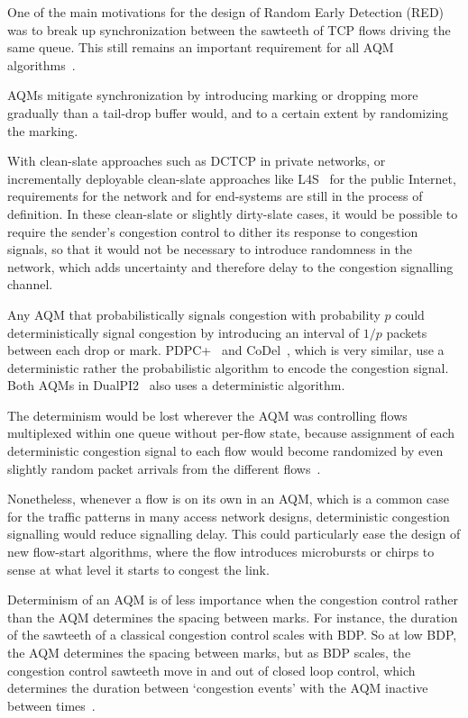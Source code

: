 One of the main motivations for the design of Random Early Detection (RED)~\cite{Floyd93:RED} was to break up synchronization between the sawteeth of TCP flows driving the same queue. This still remains an important requirement for all AQM algorithms~\cite{Baker15:AQM_Recommendations}.

AQMs mitigate synchronization by introducing marking or dropping more gradually than a tail-drop buffer would, and to a certain extent by randomizing the marking. 

With clean-slate approaches such as DCTCP in private networks, or incrementally deployable clean-slate approaches like L4S~\cite{Briscoe16a:l4s-arch_ID} for the public Internet, requirements for the network and for end-systems are still in the process of definition. In these clean-slate or slightly dirty-slate cases, it would be possible to require the sender's congestion control to dither its response to congestion signals, so that it would not be necessary to introduce randomness in the network, which adds uncertainty and therefore delay to the congestion signalling channel. 

Any AQM that probabilistically signals congestion with probability \(p\) could deterministically signal congestion by introducing an interval of \(1/p\) packets between each drop or mark. PDPC+~\cite{Sagfors03:PDPC_vary} and CoDel~\cite{Nichols12:CoDel}, which is very similar, use a deterministic rather the probabilistic algorithm to encode the congestion signal. Both AQMs in DualPI2~\cite[Appx.\ A]{Briscoe15e:DualQ-Coupled-AQM_ID} also uses a deterministic algorithm.

The determinism would be lost wherever the AQM was controlling flows multiplexed within one queue without per-flow state, because assignment of each deterministic congestion signal to each flow would become randomized by even slightly random packet arrivals from the different flows~\cite{Briscoe15d:PIE_rvw}.

Nonetheless, whenever a flow is on its own in an AQM, which is a common case for the traffic patterns in many access network designs,  deterministic congestion signalling would reduce signalling delay. This could particularly ease the design of new flow-start algorithms, where the flow introduces microbursts or chirps to sense at what level it starts to congest the link.

Determinism of an AQM is of less importance when the congestion control rather than the AQM determines the spacing between marks. For instance, the duration of the sawteeth of a classical congestion control scales with BDP. So at low BDP, the AQM determines the spacing between marks, but as BDP scales, the congestion control sawteeth move in and out of closed loop control, which determines the duration between `congestion events' with the AQM inactive between times~\cite[\S\,3.3]{Briscoe21c:pi2param}.